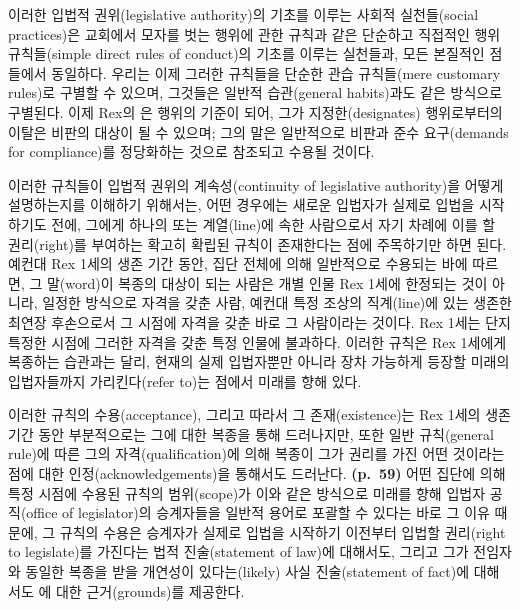 이러한 입법적 권위(legislative authority)의 기초를 이루는 사회적
실천들(social practices)은 교회에서 모자를 벗는 행위에 관한 규칙과 같은
단순하고 직접적인 행위 규칙들(simple direct rules of conduct)의 기초를
이루는 실천들과, 모든 본질적인 점들에서 동일하다. 우리는 이제 그러한
규칙들을 단순한 관습 규칙들(mere customary rules)로 구별할 수 있으며,
그것들은 일반적 습관(general habits)과도 같은 방식으로 구별된다. 이제
Rex의 은 행위의 기준이 되어, 그가 지정한(designates)
행위로부터의 이탈은 비판의 대상이 될 수 있으며; 그의 말은 일반적으로
비판과 준수 요구(demands for compliance)를 정당화하는 것으로 참조되고
수용될 것이다.

이러한 규칙들이 입법적 권위의 계속성(continuity of legislative
authority)을 어떻게 설명하는지를 이해하기 위해서는, 어떤 경우에는 새로운
입법자가 실제로 입법을 시작하기도 전에, 그에게 하나의 
또는 계열(line)에 속한 사람으로서 자기 차례에 이를 할 권리(right)를
부여하는 확고히 확립된 규칙이 존재한다는 점에 주목하기만 하면 된다.
예컨대 Rex 1세의 생존 기간 동안, 집단 전체에 의해 일반적으로 수용되는
바에 따르면, 그 말(word)이 복종의 대상이 되는 사람은 개별 인물 Rex 1세에
한정되는 것이 아니라, 일정한 방식으로 자격을 갖춘 사람, 예컨대 특정
조상의 직계(line)에 있는 생존한 최연장 후손으로서 그 시점에 자격을 갖춘
바로 그 사람이라는 것이다. Rex 1세는 단지 특정한 시점에 그러한 자격을
갖춘 특정 인물에 불과하다. 이러한 규칙은 Rex 1세에게 복종하는 습관과는
달리, 현재의 실제 입법자뿐만 아니라 장차 가능하게 등장할 미래의
입법자들까지 가리킨다(refer to)는 점에서 미래를 향해 있다.

이러한 규칙의 수용(acceptance), 그리고 따라서 그 존재(existence)는 Rex
1세의 생존 기간 동안 부분적으로는 그에 대한 복종을 통해 드러나지만, 또한
일반 규칙(general rule)에 따른 그의 자격(qualification)에 의해 복종이
그가 권리를 가진 어떤 것이라는 점에 대한 인정(acknowledgements)을
통해서도 드러난다. \textbf{(p.~59)} 어떤 집단에 의해 특정 시점에 수용된
규칙의 범위(scope)가 이와 같은 방식으로 미래를 향해 입법자 공직(office
of legislator)의 승계자들을 일반적 용어로 포괄할 수 있다는 바로 그 이유
때문에, 그 규칙의 수용은 승계자가 실제로 입법을 시작하기 이전부터 입법할
권리(right to legislate)를 가진다는 법적 진술(statement of law)에
대해서도, 그리고 그가 전임자와 동일한 복종을 받을 개연성이
있다는(likely) 사실 진술(statement of fact)에 대해서도 에 대한 근거(grounds)를 제공한다.

